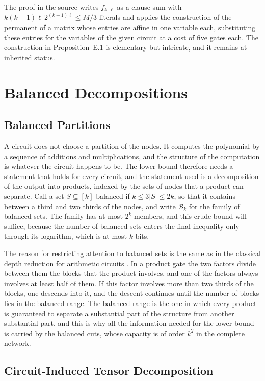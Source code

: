 \documentclass[11pt,letterpaper]{report}
\theoremstyle{plain}
\theoremstyle{definition}
\theoremstyle{remark}
\begin{document}
The proof in the source writes $f_{k,\ell}$ as a clause sum with $k(k-1)\ell\,2^{(k-1)\ell}\le M/3$ literals and applies the construction of the permanent of a matrix whose entries are affine in one variable each, substituting these entries for the variables of the given circuit at a cost of five gates each. The construction in Proposition~E.1 is elementary but intricate, and it remains at inherited status.

\chapter{Balanced Decompositions}

\section{Balanced Partitions}

A circuit does not choose a partition of the nodes. It computes the polynomial by a sequence of additions and multiplications, and the structure of the computation is whatever the circuit happens to be. The lower bound therefore needs a statement that holds for every circuit, and the statement used is a decomposition of the output into products, indexed by the sets of nodes that a product can separate. Call a set $S\subseteq[k]$ balanced if $k\le3|S|\le2k$, so that it contains between a third and two thirds of the nodes, and write $\mathcal B_k$ for the family of balanced sets. The family has at most $2^k$ members, and this crude bound will suffice, because the number of balanced sets enters the final inequality only through its logarithm, which is at most $k$ bits.

The reason for restricting attention to balanced sets is the same as in the classical depth reduction for arithmetic circuits \cite{Hyafil1979,VSBR1983}. In a product gate the two factors divide between them the blocks that the product involves, and one of the factors always involves at least half of them. If this factor involves more than two thirds of the blocks, one descends into it, and the descent continues until the number of blocks lies in the balanced range. The balanced range is the one in which every product is guaranteed to separate a substantial part of the structure from another substantial part, and this is why all the information needed for the lower bound is carried by the balanced cuts, whose capacity is of order $k^2$ in the complete network.

\section{Circuit-Induced Tensor Decomposition}
\end{document}
